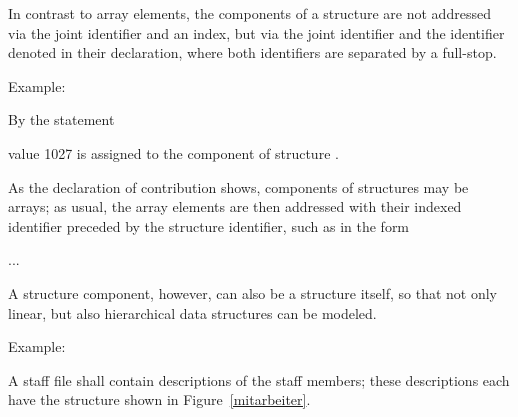 
In contrast to array elements, the components of a structure are not
addressed via the joint identifier and an index, but via the joint
identifier and the identifier denoted in their declaration, where both
identifiers are separated by a full-stop.

Example:

By the statement


value 1027 is assigned to the component  of structure 
.

As the declaration of contribution shows, components of structures may be
arrays; as usual, the array elements are then addressed with their
indexed identifier preceded by the structure identifier, such as in the
form

  ...\code{;}

A structure component, however, can also be a structure itself, so that not only
linear, but also hierarchical data structures can be modeled.

Example:

A staff file shall contain descriptions of the staff members; these
descriptions each have the structure shown in Figure~\ref{mitarbeiter}.
\newpage

